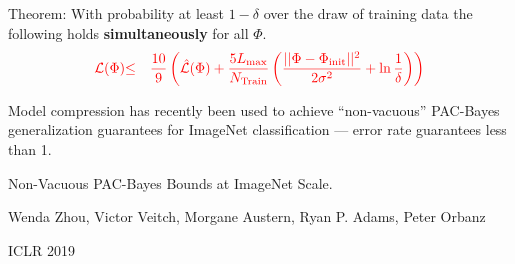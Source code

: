 {\vfill
Theorem: With probability at least $1-\delta$ over the draw of training data the following holds {\bf simultaneously} for all $\Phi$.
\begin{eqnarray*}
   {\color{red} {\cal L}(\Phi)} & {\color{red} \leq} & {\color{red} \frac{10}{9}\left(\hat{{\cal L}}(\Phi)
   + \frac{5 L_{\max}}{N_\mathrm{Train}}\left(\frac{||\Phi-\Phi_{\mathrm{init}}||^2}{2\sigma^2} + \ln \frac{1}{\delta}\right)\right)}
\end{eqnarray*}


Model compression has recently been used to achieve ``non-vacuous'' PAC-Bayes generalization guarantees for ImageNet classification
--- error rate guarantees less than 1.

\vfill
Non-Vacuous PAC-Bayes Bounds at ImageNet Scale.

\bigskip
Wenda Zhou, Victor Veitch, Morgane Austern, Ryan P. Adams, Peter Orbanz

\bigskip
ICLR 2019


}

